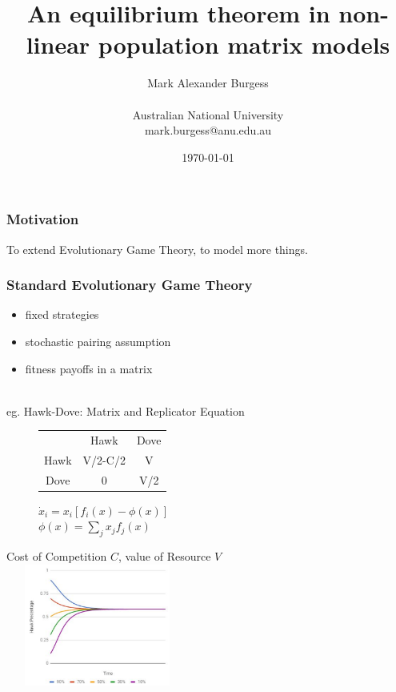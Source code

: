 \documentclass{beamer}
\title[presentationTemplate]{An equilibrium theorem in non-linear population matrix models}
\author{Mark Alexander Burgess\\$ $\\Australian National University\\mark.burgess@anu.edu.au}
\date{\today}
\begin{document}
\begin{frame}
  \titlepage
\end{frame}

\begin{frame}
\frametitle{Motivation}
To extend Evolutionary Game Theory, to model more things.
\end{frame}


\begin{frame}
\frametitle{Standard Evolutionary Game Theory}
\begin{itemize}
    \item fixed strategies
    \item stochastic pairing assumption
    \item fitness payoffs in a matrix
\end{itemize}
\-\\
eg. Hawk-Dove: Matrix and Replicator Equation
\begin{figure}
\centering
\begin{minipage}{5cm}
\begin{table}[]
\begin{tabular}{ccc}
                          & Hawk                         & Dove                     \\ \cline{2-3} 
\multicolumn{1}{c|}{Hawk} & \multicolumn{1}{c|}{V/2-C/2} & \multicolumn{1}{c|}{V}   \\ \cline{2-3} 
\multicolumn{1}{c|}{Dove} & \multicolumn{1}{c|}{0}       & \multicolumn{1}{c|}{V/2} \\ \cline{2-3} 
\end{tabular}
\end{table}
\end{minipage}
\begin{minipage}{5cm}
$ \dot{x}_i = x_i[f_i(x) - \phi(x)]$\\
$ \phi(x) = \sum_jx_jf_j(x)$
\end{minipage}
\end{figure}
Cost of Competition $C$, value of Resource $V$\\
\includegraphics[width=60mm,height=40mm]{hawk_dove_graph.png}
\end{frame}
\end{document}
